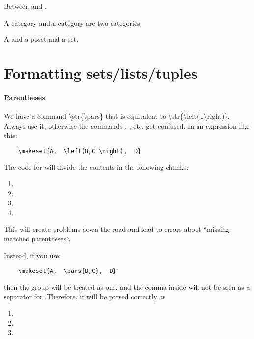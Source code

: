 Between \reals and \reals.

A category \Set and a category \SetL are two categories.

A  and a poset and a set.


\section{Formatting sets/lists/tuples}

\paragraph{Parentheses}

We have a command \textbackslash str\{\textbackslash pars\} that is equivalent to \textbackslash str\{\textbackslash left(\ldots\textbackslash right)\}.
Always use it, otherwise the commands \str{\makeset}, \str{\makelist}, etc. get confused.
In an expression like this:

\begin{verbatim}
    \makeset{A,  \left(B,C \right),  D}
\end{verbatim}

The code for \str{\makeset} will divide the contents in the following chunks:

\begin{enumerate}
    \item {}
    \item {}
    \item {}
    \item {}
\end{enumerate}
This will create problems down the road and lead to errors about ``missing matched parentheses''.

Instead, if you use:

\begin{verbatim}
    \makeset{A,  \pars{B,C},  D}
\end{verbatim}

then the group  will be treated as one, and the comma inside will not be seen as a separator for \str{\makeset}.Therefore, it will be parsed correctly as

\begin{enumerate}
    \item {}
    \item {}
    \item {}
\end{enumerate}

